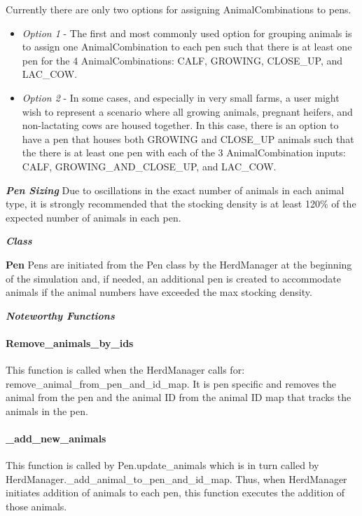 \documentclass{article}
\begin{document}
\begin{refsection}
 
 Currently there are only two options for assigning AnimalCombinations to pens. 
\vspace{0.2cm}
\begin{itemize}
    \item \textit{Option 1} - The first and most commonly used option for grouping animals is to assign one AnimalCombination to each pen such that there is at least one pen for the 4 AnimalCombinations: CALF, GROWING, CLOSE\_UP, and LAC\_COW. 
    \item \textit{Option 2} - In some cases, and especially in very small farms, a user might wish to represent a scenario where all growing animals, pregnant heifers, and non-lactating cows are housed together. In this case, there is an option to have a pen that houses both GROWING and CLOSE\_UP animals such that the there is at least one pen with each of the 3 AnimalCombination inputs: CALF, GROWING\_AND\_CLOSE\_UP, and LAC\_COW. 
\end{itemize}


    \textbf{\textit{Pen Sizing}} Due to oscillations in the exact number of animals in each animal type, it is strongly recommended that the stocking density is at least 120\% of the expected number of animals in each pen. 
    \vspace{0.2cm}
    
    \textbf{\textit{Class}} 
    \vspace{0.2cm}
    
    \textbf{Pen}
    Pens are initiated from the Pen class by the HerdManager at the beginning of the simulation and, if needed, an additional pen is created to accommodate animals if the animal numbers have exceeded the max stocking density. 

    \textbf{\textit{Noteworthy Functions}} 
    \vspace{0.2cm}
    
    \paragraph{Remove\_animals\_by\_ids} This function is called when the HerdManager calls for: remove\_animal\_from\_pen\_and\_id\_map. It is pen specific and removes the animal from the pen and the animal ID from the animal ID map that tracks the animals in the pen. 


    \paragraph{\_add\_new\_animals}This function is called by Pen.update\_animals which is in turn called by HerdManager.\_add\_animal\_to\_pen\_and\_id\_map. Thus, when HerdManager initiates addition of animals to each pen, this function executes the addition of those animals. 


\end{refsection}
\end{document}
